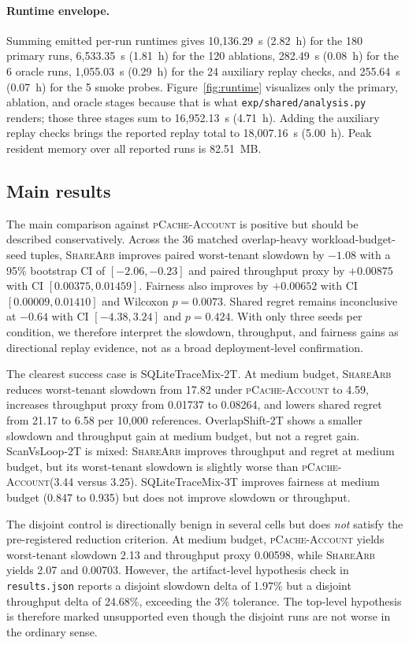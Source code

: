 \documentclass{article}
\newcommand{\sharearb}{\textsc{ShareArb}\xspace}
\newcommand{\pcache}{\textsc{pCache-Account}\xspace}
\begin{document}
\paragraph{Runtime envelope.}
Summing emitted per-run runtimes gives 10{,}136.29~s (2.82~h) for the 180 primary runs, 6{,}533.35~s (1.81~h) for the 120 ablations, 282.49~s (0.08~h) for the 6 oracle runs, 1{,}055.03~s (0.29~h) for the 24 auxiliary replay checks, and 255.64~s (0.07~h) for the 5 smoke probes. Figure~\ref{fig:runtime} visualizes only the primary, ablation, and oracle stages because that is what \texttt{exp/shared/analysis.py} renders; those three stages sum to 16{,}952.13~s (4.71~h). Adding the auxiliary replay checks brings the reported replay total to 18{,}007.16~s (5.00~h). Peak resident memory over all reported runs is 82.51~MB.

\subsection{Main results}

The main comparison against \pcache is positive but should be described conservatively. Across the 36 matched overlap-heavy workload-budget-seed tuples, \sharearb improves paired worst-tenant slowdown by $-1.08$ with a 95\% bootstrap CI of $[-2.06,-0.23]$ and paired throughput proxy by $+0.00875$ with CI $[0.00375,0.01459]$. Fairness also improves by $+0.00652$ with CI $[0.00009,0.01410]$ and Wilcoxon $p=0.0073$. Shared regret remains inconclusive at $-0.64$ with CI $[-4.38,3.24]$ and $p=0.424$. With only three seeds per condition, we therefore interpret the slowdown, throughput, and fairness gains as directional replay evidence, not as a broad deployment-level confirmation.

The clearest success case is SQLiteTraceMix-2T. At medium budget, \sharearb reduces worst-tenant slowdown from 17.82 under \pcache to 4.59, increases throughput proxy from 0.01737 to 0.08264, and lowers shared regret from 21.17 to 6.58 per 10{,}000 references. OverlapShift-2T shows a smaller slowdown and throughput gain at medium budget, but not a regret gain. ScanVsLoop-2T is mixed: \sharearb improves throughput and regret at medium budget, but its worst-tenant slowdown is slightly worse than \pcache (3.44 versus 3.25). SQLiteTraceMix-3T improves fairness at medium budget (0.847 to 0.935) but does not improve slowdown or throughput.

The disjoint control is directionally benign in several cells but does \emph{not} satisfy the pre-registered reduction criterion. At medium budget, \pcache yields worst-tenant slowdown 2.13 and throughput proxy 0.00598, while \sharearb yields 2.07 and 0.00703. However, the artifact-level hypothesis check in \texttt{results.json} reports a disjoint slowdown delta of 1.97\% but a disjoint throughput delta of 24.68\%, exceeding the 3\% tolerance. The top-level hypothesis is therefore marked unsupported even though the disjoint runs are not worse in the ordinary sense.
\end{document}
